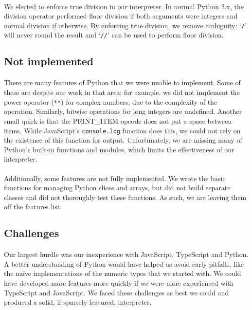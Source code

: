 \documentclass{article}
\begin{document}
\paragraph{}
We elected to enforce true division in our interpreter. In normal Python 2.x, the division operator performed floor division if both arguments were integers and normal division if otherwise. By enforcing true division, we remove ambiguity: `\texttt{/}' will never round the result and `\texttt{//}' can be used to perform floor division.

\subsection{Not implemented}

\paragraph{}
There are many features of Python that we were unable to implement. Some of these are despite our work in that area; for example, we did not implement the power operator (\texttt{**}) for complex numbers, due to the complexity of the operation. Similarly, bitwise operations for long integers are undefined. Another small quirk is that the PRINT\_ITEM opcode does not put a space between items. While JavaScript's \texttt{console.log} function does this, we could not rely on the existence of this function for output. Unfortunately, we are missing many of Python's built-in functions and modules, which limits the effectiveness of our interpreter.

\paragraph{}
Additionally, some features are not fully implemented. We wrote the basic functions for managing Python slices and arrays, but did not build separate classes and did not thoroughly test these functions. As such, we are leaving them off the features list.

\subsection{Challenges}

\paragraph{}
Our largest hurdle was our inexperience with JavaScript, TypeScript and Python. A better understanding of Python would have helped us avoid early pitfalls, like the na\"ive implementations of the numeric types that we started with. We could have developed more features more quickly if we were more experienced with TypeScript and JavaScript. We faced these challenges as best we could and produced a solid, if sparsely-featured, interpreter.

%
%

\end{document}

